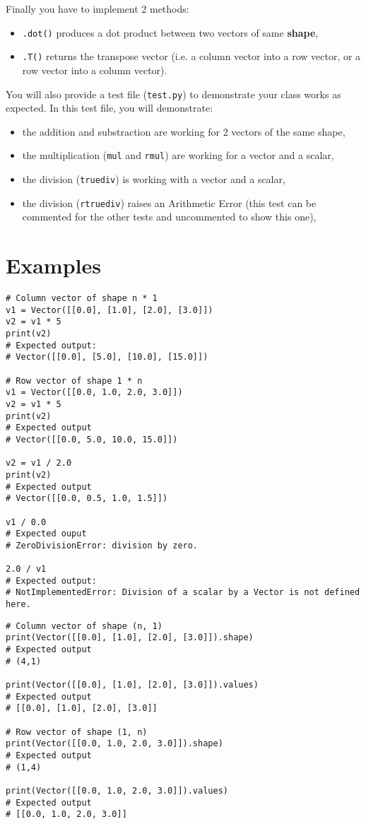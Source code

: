 Finally you have to implement 2 methods: 
\begin{itemize}
  \item \texttt{.dot()} produces a dot product between two vectors of same \textbf{shape},
  \item \texttt{.T()} returns the transpose vector (i.e. a column vector into a row vector, or a row vector into a column vector).
\end{itemize}

You will also provide a test file (\texttt{test.py}) to demonstrate your class
works as expected. In this test file, you will demonstrate:
\begin{itemize}
  \item the addition and substraction are working for 2 vectors of the same shape,
  \item the multiplication (\texttt{mul} and \texttt{rmul}) are working for a vector and a scalar,
  \item the division (\texttt{truediv}) is working with a vector and a scalar,
  \item the division (\texttt{rtruediv}) raises an Arithmetic Error (this test can be commented for the other tests and uncommented to show this one),
\end{itemize}

\section*{Examples}
\begin{verbatim}
# Column vector of shape n * 1
v1 = Vector([[0.0], [1.0], [2.0], [3.0]])
v2 = v1 * 5
print(v2)
# Expected output:
# Vector([[0.0], [5.0], [10.0], [15.0]])

# Row vector of shape 1 * n
v1 = Vector([[0.0, 1.0, 2.0, 3.0]])
v2 = v1 * 5
print(v2)
# Expected output
# Vector([[0.0, 5.0, 10.0, 15.0]])

v2 = v1 / 2.0
print(v2)
# Expected output
# Vector([[0.0, 0.5, 1.0, 1.5]])

v1 / 0.0
# Expected ouput
# ZeroDivisionError: division by zero.

2.0 / v1
# Expected output:
# NotImplementedError: Division of a scalar by a Vector is not defined here.
\end{verbatim}

\begin{verbatim}
# Column vector of shape (n, 1)
print(Vector([[0.0], [1.0], [2.0], [3.0]]).shape)
# Expected output
# (4,1)

print(Vector([[0.0], [1.0], [2.0], [3.0]]).values)
# Expected output
# [[0.0], [1.0], [2.0], [3.0]]

# Row vector of shape (1, n)
print(Vector([[0.0, 1.0, 2.0, 3.0]]).shape)
# Expected output
# (1,4)

print(Vector([[0.0, 1.0, 2.0, 3.0]]).values)
# Expected output
# [[0.0, 1.0, 2.0, 3.0]]
\end{verbatim}


